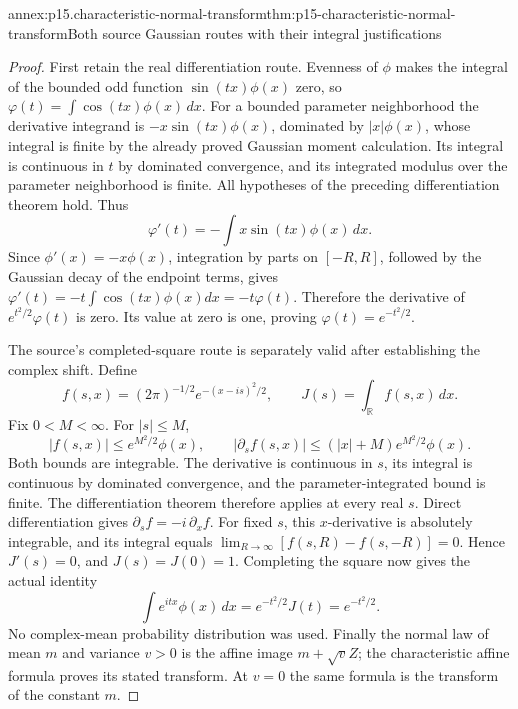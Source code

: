 \begin{annexitem}{annex:p15.characteristic-normal-transform}{thm:p15-characteristic-normal-transform}{Both source Gaussian routes with their integral justifications}
\begin{proof}
First retain the real differentiation route. Evenness of
\(\phi\) makes the integral of the bounded odd function
\(\sin(tx)\phi(x)\) zero, so
\(\varphi(t)=\int\cos(tx)\phi(x)\,dx\).
For a bounded parameter neighborhood the derivative
integrand is \(-x\sin(tx)\phi(x)\), dominated by
\(|x|\phi(x)\), whose integral is finite by the already
proved Gaussian moment calculation.
Its integral is continuous in \(t\) by dominated
convergence, and its integrated modulus over the parameter
neighborhood is finite. All hypotheses of the preceding
differentiation theorem hold. Thus
\[
 \varphi'(t)=-\int x\sin(tx)\phi(x)\,dx.
\]
Since \(\phi'(x)=-x\phi(x)\), integration by parts on
\([-R,R]\), followed by the Gaussian decay of the
endpoint terms, gives
\(\varphi'(t)=-t\int\cos(tx)\phi(x)dx=-t\varphi(t)\).
Therefore the derivative of \(e^{t^2/2}\varphi(t)\)
is zero. Its value at zero is one, proving
\(\varphi(t)=e^{-t^2/2}\).

The source's completed-square route is separately valid
after establishing the complex shift. Define
\[
 f(s,x)=(2\pi)^{-1/2}e^{-(x-is)^2/2},\qquad
 J(s)=\int_{\mathbb R}f(s,x)\,dx.
\]
Fix \(0<M<\infty\). For \(|s|\leq M\),
\[
 |f(s,x)|\leq e^{M^2/2}\phi(x),\qquad
 |\partial_s f(s,x)|
       \leq(|x|+M)e^{M^2/2}\phi(x).
\]
Both bounds are integrable. The derivative is continuous
in \(s\), its integral is continuous by dominated
convergence, and the parameter-integrated bound is finite.
The differentiation theorem therefore applies at every
real \(s\). Direct differentiation gives
\(\partial_s f=-i\,\partial_x f\).
For fixed \(s\), this \(x\)-derivative is absolutely
integrable, and its integral equals
\(\lim_{R\to\infty}[f(s,R)-f(s,-R)]=0\).
Hence \(J'(s)=0\), and \(J(s)=J(0)=1\).
Completing the square now gives the actual identity
\[
 \int e^{itx}\phi(x)\,dx=e^{-t^2/2}J(t)=e^{-t^2/2}.
\]
No complex-mean probability distribution was used.
Finally the normal law of mean \(m\) and variance \(v>0\)
is the affine image \(m+\sqrt v Z\); the characteristic
affine formula proves its stated transform. At \(v=0\)
the same formula is the transform of the constant \(m\).
\end{proof}
\end{annexitem}

